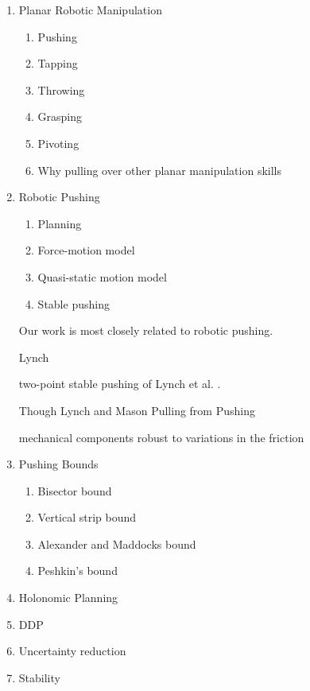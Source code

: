 \documentclass[conference]{IEEEtran}
\begin{document}
\begin{enumerate}
\item Planar Robotic Manipulation
  \begin{enumerate}
  \item Pushing
  \item Tapping
  \item Throwing
  \item Grasping
  \item Pivoting
  \item Why pulling over other planar manipulation skills
  \end{enumerate}
\item Robotic Pushing
  \begin{enumerate}
  \item Planning
  \item Force-motion model
  \item Quasi-static motion model
  \item Stable pushing
  \end{enumerate}

  Our work is most closely related to robotic pushing.

  Lynch 

  two-point stable pushing of Lynch et al. \cite{}.

  Though Lynch and Mason Pulling from Pushing \cite{lynch1995pulling}

  mechanical components robust to variations in the friction

\item Pushing Bounds

  \begin{enumerate}
  \item Bisector bound
  \item Vertical strip bound
  \item Alexander and Maddocks bound
  \item Peshkin's bound
  \end{enumerate}

\item Holonomic Planning
\item DDP
\item Uncertainty reduction
\item Stability
\end{enumerate}
\end{document}
